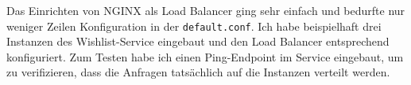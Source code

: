 \documentclass[12pt]{article}
\begin{document}
Das Einrichten von NGINX als Load Balancer ging sehr einfach und bedurfte nur weniger Zeilen Konfiguration in der \texttt{default.conf}.
Ich habe beispielhaft drei Instanzen des Wishlist-Service eingebaut und den Load Balancer entsprechend konfiguriert.
Zum Testen habe ich einen Ping-Endpoint im Service eingebaut, um zu verifizieren, dass die Anfragen tatsächlich auf die Instanzen verteilt werden.
	
\end{document}
